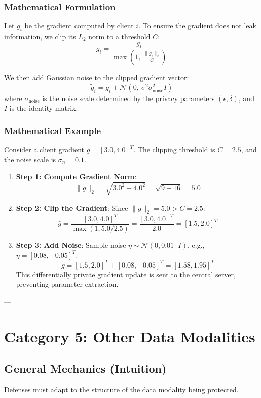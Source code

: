 \documentclass{article}
\begin{document}
\subsubsection{Mathematical Formulation}
Let $g_i$ be the gradient computed by client $i$. To ensure the gradient does not leak information, we clip its $L_2$ norm to a threshold $C$:
\begin{equation}
    \bar{g}_i = \frac{g_i}{\max\left( 1, \ \frac{\|g_i\|_2}{C} \right)}
\end{equation}

We then add Gaussian noise to the clipped gradient vector:
\begin{equation}
    \tilde{g}_i = \bar{g}_i + \mathcal{N}\left( 0, \ \sigma^2 \sigma_{\text{noise}}^2 I \right)
\end{equation}
where $\sigma_{\text{noise}}$ is the noise scale determined by the privacy parameters $(\epsilon, \delta)$, and $I$ is the identity matrix.

\subsubsection{Mathematical Example}
Consider a client gradient $g = [3.0, 4.0]^T$. The clipping threshold is $C = 2.5$, and the noise scale is $\sigma_n = 0.1$.
\begin{enumerate}
    \item \textbf{Step 1: Compute Gradient Norm}:
    $$\|g\|_2 = \sqrt{3.0^2 + 4.0^2} = \sqrt{9 + 16} = 5.0$$
    
    \item \textbf{Step 2: Clip the Gradient}: Since $\|g\|_2 = 5.0 > C = 2.5$:
    $$\bar{g} = \frac{[3.0, 4.0]^T}{\max(1, 5.0/2.5)} = \frac{[3.0, 4.0]^T}{2.0} = [1.5, 2.0]^T$$
    
    \item \textbf{Step 3: Add Noise}: Sample noise $\eta \sim \mathcal{N}(0, 0.01 \cdot I)$, e.g., $\eta = [0.08, -0.05]^T$.
    $$\tilde{g} = [1.5, 2.0]^T + [0.08, -0.05]^T = [1.58, 1.95]^T$$
    This differentially private gradient update is sent to the central server, preventing parameter extraction.
\end{enumerate}

---

\section{Category 5: Other Data Modalities}

\subsection{General Mechanics (Intuition)}
Defenses must adapt to the structure of the data modality being protected. 
\end{document}

